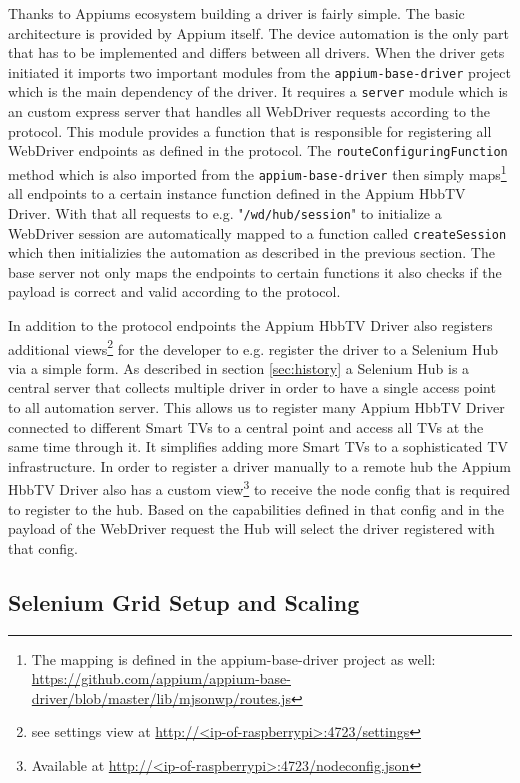 Thanks to Appiums ecosystem building a driver is fairly simple. The basic architecture is provided by Appium itself.
The device automation is the only part that has to be implemented and differs between all drivers. When the driver
gets initiated it imports two important modules from the \texttt{appium-base-driver} project which is the main
dependency of the driver. It requires a \texttt{server} module which is an custom express server that handles
all WebDriver requests according to the protocol. This module provides a function that is responsible for registering
all WebDriver endpoints as defined in the protocol. The \texttt{routeConfiguringFunction} method which is also
imported from the \texttt{appium-base-driver} then simply maps\footnote{The mapping is defined in the appium-base-driver
project as well: \url{https://github.com/appium/appium-base-driver/blob/master/lib/mjsonwp/routes.js}} all endpoints
to a certain instance function defined in the Appium HbbTV Driver. With that all requests to e.g. "\texttt{/wd/hub/session}"
to initialize a WebDriver session are automatically mapped to a function called \texttt{createSession} which then
initializies the automation as described in the previous section. The base server not only maps the endpoints to
certain functions it also checks if the payload is correct and valid according to the protocol.

In addition to the protocol endpoints the Appium HbbTV Driver also registers additional views\footnote{see settings
view at \url{http://<ip-of-raspberrypi>:4723/settings}} for the developer to e.g. register the driver to a
Selenium Hub via a simple form. As described in section \ref{sec:history} a Selenium Hub is a central server that
collects multiple driver in order to have a single access point to all automation server. This allows us to register
many Appium HbbTV Driver connected to different Smart TVs to a central point and access all TVs at the same time
through it. It simplifies adding more Smart TVs to a sophisticated TV infrastructure. In order to register a driver
manually to a remote hub the Appium HbbTV Driver also has a custom view\footnote{Available at
\url{http://<ip-of-raspberrypi>:4723/nodeconfig.json}} to receive the node config that is required to register to the
hub. Based on the capabilities defined in that config and in the payload of the WebDriver request the Hub will select
the driver registered with that config.

\subsection{Selenium Grid Setup and Scaling\label{sec:setupscaling}}

